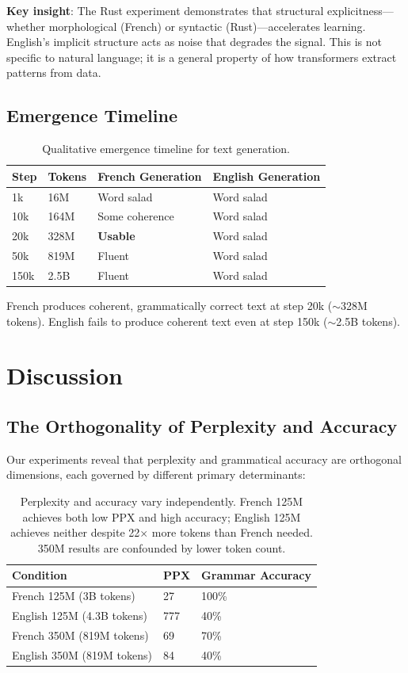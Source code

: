 \documentclass[11pt,a4paper]{article}
\begin{document}
\textbf{Key insight}: The Rust experiment demonstrates that structural explicitness---whether morphological (French) or syntactic (Rust)---accelerates learning. English's implicit structure acts as noise that degrades the signal. This is not specific to natural language; it is a general property of how transformers extract patterns from data.

\subsection{Emergence Timeline}

\begin{table}[h]
\centering
\begin{tabular}{llll}
\toprule
Step & Tokens & French Generation & English Generation \\
\midrule
1k & 16M & Word salad & Word salad \\
10k & 164M & Some coherence & Word salad \\
20k & 328M & \textbf{Usable} & Word salad \\
50k & 819M & Fluent & Word salad \\
150k & 2.5B & Fluent & Word salad \\
\bottomrule
\end{tabular}
\caption{Qualitative emergence timeline for text generation.}
\label{tab:emergence}
\end{table}

French produces coherent, grammatically correct text at step 20k ($\sim$328M tokens). English fails to produce coherent text even at step 150k ($\sim$2.5B tokens).

\section{Discussion}

\subsection{The Orthogonality of Perplexity and Accuracy}

Our experiments reveal that perplexity and grammatical accuracy are orthogonal dimensions, each governed by different primary determinants:

\begin{table}[h]
\centering
\begin{tabular}{lll}
\toprule
Condition & PPX & Grammar Accuracy \\
\midrule
French 125M (3B tokens) & 27 & 100\% \\
English 125M (4.3B tokens) & 777 & 40\% \\
French 350M (819M tokens) & 69 & 70\% \\
English 350M (819M tokens) & 84 & 40\% \\
\bottomrule
\end{tabular}
\caption{Perplexity and accuracy vary independently. French 125M achieves both low PPX and high accuracy; English 125M achieves neither despite 22$\times$ more tokens than French needed. 350M results are confounded by lower token count.}
\label{tab:orthogonality}
\end{table}
\end{document}
